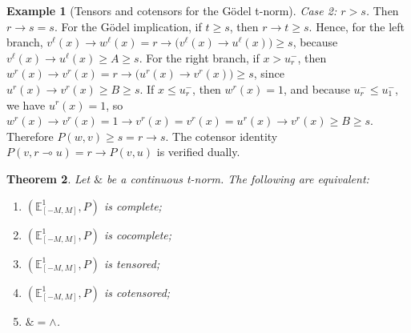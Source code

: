 \documentclass[preprint,3p,times]{elsarticle}
\theoremstyle{plain}
\newtheorem{thm}{Theorem}[section]
\theoremstyle{definition}
\newtheorem{exmp}[thm]{Example}
\numberwithin{equation}{section}
\begin{document}
\begin{exmp}[Tensors and cotensors for the Gödel t-norm]
\emph{Case 2: \(r>s\).} Then \(r\to s=s\). For the Gödel implication, if
\(t\ge s\), then \(r\to t\ge s\). Hence, for the left branch,
\(v^\ell(x)\to w^\ell(x)=r\to\bigl(v^\ell(x)\to u^\ell(x)\bigr)\ge s\), because
\(v^\ell(x)\to u^\ell(x)\ge A\ge s\). For the right branch, if \(x>u^-_r\),
then
\(w^r(x)\to v^r(x)=r\to\bigl(u^r(x)\to v^r(x)\bigr)\ge s\), since
\(u^r(x)\to v^r(x)\ge B\ge s\). If \(x\le u^-_r\), then \(w^r(x)=1\), and
because \(u^-_r\le u_1^-\), we have \(u^r(x)=1\), so
\(w^r(x)\to v^r(x)=1\to v^r(x)=v^r(x)=u^r(x)\to v^r(x)\ge B\ge s\).
Therefore \(P(w,v)\ge s=r\to s\).
 The cotensor identity
\(P(v,r\multimap u)=r\to P(v,u)\) is verified dually.
\end{exmp}
\begin{thm}\label{completeness iff Godel}
Let \(\&\) be a continuous t-norm. The following are equivalent:
\begin{enumerate}[label={\rm(\arabic*)}]
    \item \((\mathbb E^1_{[-M,M]},P)\) is complete;
    \item \((\mathbb E^1_{[-M,M]},P)\) is cocomplete;
    \item \((\mathbb E^1_{[-M,M]},P)\) is tensored;
    \item \((\mathbb E^1_{[-M,M]},P)\) is cotensored;
    \item \(\&=\wedge\).
\end{enumerate}
\end{thm}
\end{document}
